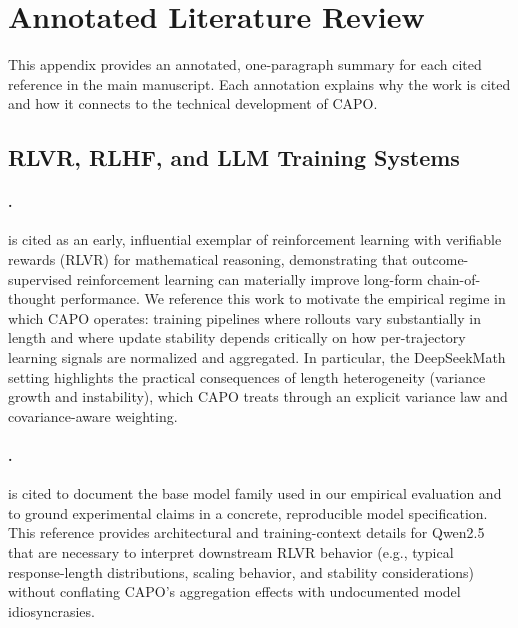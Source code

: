 \section{Annotated Literature Review}\label{app:annotated_lit_review}

This appendix provides an annotated, one-paragraph summary for each cited reference in the main manuscript.
Each annotation explains why the work is cited and how it connects to the technical development of CAPO.

\subsection{RLVR, RLHF, and LLM Training Systems}

\paragraph{\citet{shao2024deepseekmath}.}
\citet{shao2024deepseekmath} is cited as an early, influential exemplar of reinforcement learning with verifiable rewards (RLVR) for mathematical reasoning, demonstrating that outcome-supervised reinforcement learning can materially improve long-form chain-of-thought performance.
We reference this work to motivate the empirical regime in which CAPO operates: training pipelines where rollouts vary substantially in length and where update stability depends critically on how per-trajectory learning signals are normalized and aggregated.
In particular, the DeepSeekMath setting highlights the practical consequences of length heterogeneity (variance growth and instability), which CAPO treats through an explicit variance law and covariance-aware weighting.

\paragraph{\citet{qwen2024qwen25}.}
\citet{qwen2024qwen25} is cited to document the base model family used in our empirical evaluation and to ground experimental claims in a concrete, reproducible model specification.
This reference provides architectural and training-context details for Qwen2.5 that are necessary to interpret downstream RLVR behavior (e.g., typical response-length distributions, scaling behavior, and stability considerations) without conflating CAPO's aggregation effects with undocumented model idiosyncrasies.

